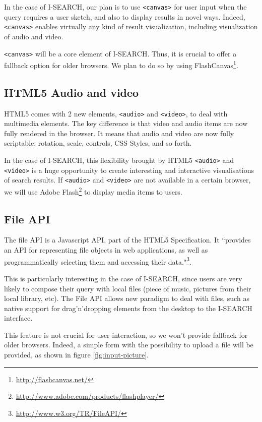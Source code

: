 \documentclass[runningheads,a4paper]{llncs} \usepackage[utf8]{inputenc}
\begin{document}
In the case of \mbox{I-SEARCH}, our plan is to use {\tt <canvas>} for user input when the query requires a user sketch, and also to display results in novel ways. Indeed, {\tt <canvas>} enables virtually any kind of result visualization, including visualization of audio and video.

{\tt <canvas>} will be a core element of \mbox{I-SEARCH}. Thus, it is crucial to offer a fallback option for older browsers. We plan to do so by using FlashCanvas\footnote{\url{http://flashcanvas.net/}}.


\subsection{HTML5 Audio and video}
HTML5 comes with 2 new elements, {\tt <audio>} and {\tt <video>}, to deal with multimedia elements. The key difference is that video and audio items are now fully rendered in the browser. It means that audio and video are now fully scriptable: rotation, scale, controls, CSS Styles, and so forth. 

In the case of \mbox{I-SEARCH}, this flexibility brought by HTML5 {\tt <audio>} and {\tt <video>} is a huge opportunity to create interesting and interactive visualisations of search results.
If  {\tt <audio>} and {\tt <video>} are not available in a certain browser, we will use Adobe Flash\footnote{\url{http://www.adobe.com/products/flashplayer/}} to display media items to users.

\subsection{File API}

The file API is a Javascript API, part of the HTML5 Specification. It ``provides an API for representing file objects in web applications, as well as programmatically selecting them and accessing their data."\footnote{\url{http://www.w3.org/TR/FileAPI/}}. 

This is particularly interesting in the case of \mbox{I-SEARCH}, since users are very likely to compose their query with local files (piece of music, pictures from their local library, etc). The File API allows new paradigm to deal with files, such as native support for drag'n'dropping elements from the desktop to the \mbox{I-SEARCH} interface.

This feature is not crucial for user interaction, so we won't provide fallback for older browsers. Indeed, a simple form with the possibility to upload a file will be provided, as shown in figure \ref{fig:input-picture}.
 
\end{document}
